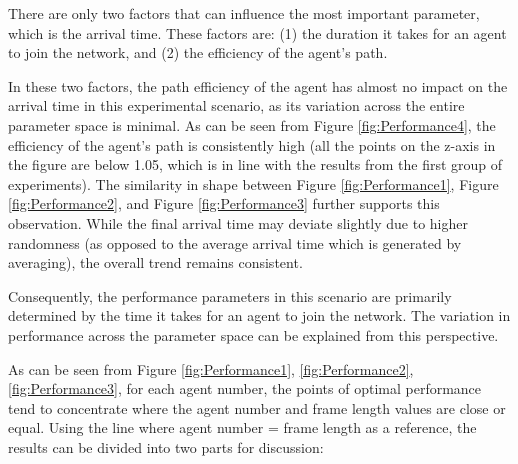 \FloatBarrier

There are only two factors that can influence the most important parameter, which is the arrival time. These factors are: (1) the duration it takes for an agent to join the network, and (2) the efficiency of the agent's path. 

In these two factors, the path efficiency of the agent has almost no impact on the arrival time in this experimental scenario, as its variation across the entire parameter space is minimal.
As can be seen from Figure \ref{fig:Performance4}, the efficiency of the agent's path is consistently high (all the points on the z-axis in the figure are below 1.05, which is in line with the results from the first group of experiments).
The similarity in shape between Figure \ref{fig:Performance1}, Figure \ref{fig:Performance2}, and Figure \ref{fig:Performance3} further supports this observation. While the final arrival time may deviate slightly due to higher randomness (as opposed to the average arrival time which is generated by averaging), the overall trend remains consistent.


Consequently, the performance parameters in this scenario are primarily determined by the time it takes for an agent to join the network. The variation in performance across the parameter space can be explained from this perspective.


As can be seen from Figure \ref{fig:Performance1}, \ref{fig:Performance2}, \ref{fig:Performance3}, for each agent number, the points of optimal performance tend to concentrate where the agent number and frame length values are close or equal. 
Using the line where agent number = frame length as a reference, the results can be divided into two parts for discussion:

